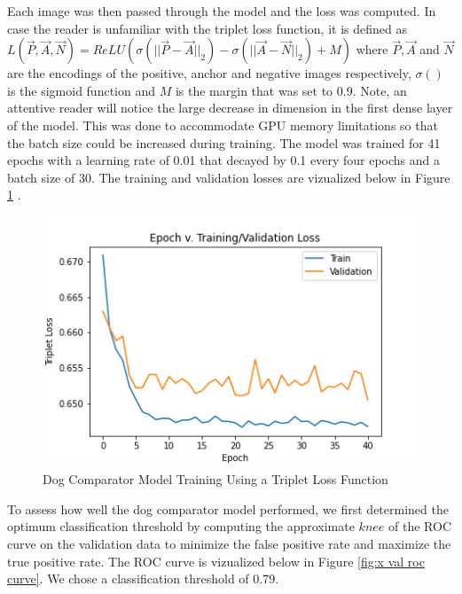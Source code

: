 \documentclass{article}
\begin{document}
Each image was then passed through the model and the loss was computed.  In case the reader is unfamiliar with the triplet loss function,  it is defined as $L(\vec{P}, \vec{A}, \vec{N}) = ReLU(\sigma(||\vec{P}-\vec{A}||_2) - \sigma(||\vec{A}- \vec{N}||_2) + M)$ where $\vec{P}, \vec{A}$ and $\vec{N}$ are the encodings of the positive, anchor and negative images respectively, $\sigma()$ is the sigmoid function and $M$ is the margin that was set to 0.9.  Note, an attentive reader will notice the large decrease in dimension in the first dense layer of the model.  This was done to accommodate GPU memory limitations so that the batch size could be increased during training.   The model was trained for 41 epochs with a learning rate of 0.01 that decayed by 0.1 every four epochs and a batch size of 30.  The training and validation losses are vizualized below in Figure \ref{fig:x epoch_v_map} .

\begin{figure}[h]
\centering
	\includegraphics[scale=0.7]{final-report-images/triplet_training.png}
\caption{Dog Comparator Model Training Using a Triplet Loss Function}
\label{fig:x epoch_v_map}
\end{figure}
To assess how well the dog comparator model performed, we first determined the optimum classification threshold by computing the approximate $knee$ of the ROC curve on the validation data to minimize the false positive rate and maximize the true positive rate.  The ROC curve is vizualized below in Figure \ref{fig:x val roc curve}.  We chose a classification threshold of 0.79.
\end{document}
